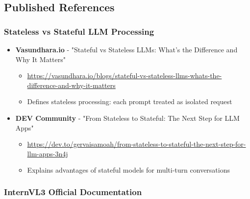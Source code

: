 \documentclass[11pt,a4paper]{article}
\begin{document}
\subsection{Published References}

\subsubsection{Stateless vs Stateful LLM Processing}

\begin{itemize}[leftmargin=*]
    \item \textbf{Vasundhara.io} - "Stateful vs Stateless LLMs: What's the Difference and Why It Matters"
    \begin{itemize}
        \item \url{https://vasundhara.io/blogs/stateful-vs-stateless-llms-whats-the-difference-and-why-it-matters}
        \item Defines stateless processing: each prompt treated as isolated request
    \end{itemize}

    \item \textbf{DEV Community} - "From Stateless to Stateful: The Next Step for LLM Apps"
    \begin{itemize}
        \item \url{https://dev.to/gervaisamoah/from-stateless-to-stateful-the-next-step-for-llm-apps-3n4j}
        \item Explains advantages of stateful models for multi-turn conversations
    \end{itemize}
\end{itemize}

\subsubsection{InternVL3 Official Documentation}
\end{document}
